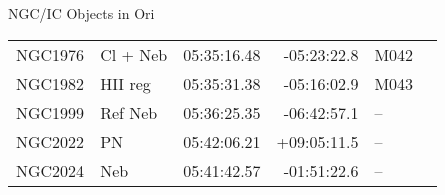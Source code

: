 \begin{block}{NGC/IC Objects in Ori}
  \centering
  \begin{tabularx}{\textwidth}{llrrll} 
    NGC1976 & Cl + Neb & 05:35:16.48 & -05:23:22.8  & M042 \\ 
    NGC1982 & HII reg & 05:35:31.38 & -05:16:02.9  & M043 \\ 
    NGC1999 & Ref Neb & 05:36:25.35 & -06:42:57.1  & -- \\ 
    NGC2022 & PN & 05:42:06.21 & +09:05:11.5  & -- \\ 
    NGC2024 & Neb & 05:41:42.57 & -01:51:22.6  & -- \\ 
  \end{tabularx}
\end{block}